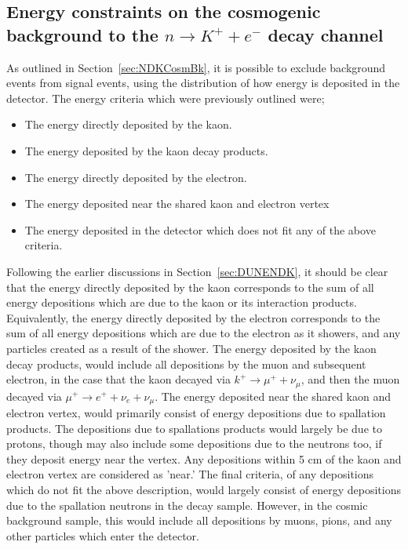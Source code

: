 \subsection{Energy constraints on the cosmogenic background to the $n \rightarrow K^{+} + e^{-}$ decay channel} \label{sec:NDKEnCosmBk}
As outlined in Section~\ref{sec:NDKCosmBk}, it is possible to exclude background events from signal events, using the distribution of how energy is deposited in the detector. The energy criteria which were previously outlined were;
\begin{itemize}
\item The energy directly deposited by the kaon.
\item The energy deposited by the kaon decay products.
\item The energy directly deposited by the electron.
\item The energy deposited near the shared kaon and electron vertex
\item The energy deposited in the detector which does not fit any of the above criteria.
\end{itemize}
Following the earlier discussions in Section~\ref{sec:DUNENDK}, it should be clear that the energy directly deposited by the kaon corresponds to the sum of all energy depositions which are due to the kaon or its interaction products. Equivalently, the energy directly deposited by the electron corresponds to the sum of all energy depositions which are due to the electron as it showers, and any particles created as a result of the shower. The energy deposited by the kaon decay products, would include all depositions by the muon and subsequent electron, in the case that the kaon decayed via $k^{+} \rightarrow \mu^{+} + \nu_{\mu}$, and then the muon decayed via $\mu^{+} \rightarrow e^{+} + \nu_{e} + \nu_{\mu}$. The energy deposited near the shared kaon and electron vertex, would primarily consist of energy depositions due to spallation products. The depositions due to spallations products would largely be due to protons, though may also include some depositions due to the neutrons too, if they deposit energy near the vertex. Any depositions within 5 cm of the kaon and electron vertex are considered as 'near.' The final criteria, of any depositions which do not fit the above description, would largely consist of energy depositions due to the spallation neutrons in the decay sample. However, in the cosmic background sample, this would include all depositions by muons, pions, and any other particles which enter the detector. \\

